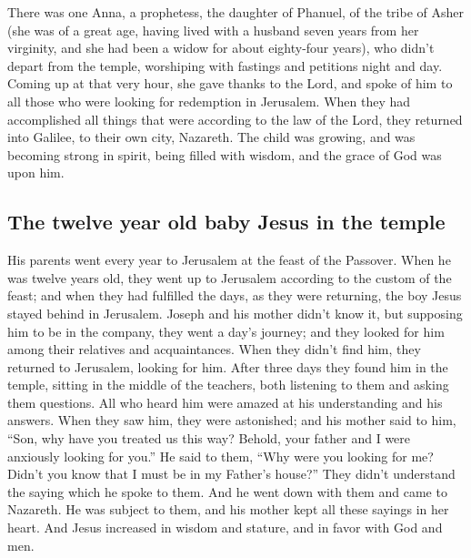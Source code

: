  There was one Anna, a prophetess, the daughter of
Phanuel, of the tribe of Asher (she was of a great age, having lived
with a husband seven years from her virginity,  and she
had been a widow for about eighty-four years), who didn't depart from
the temple, worshiping with fastings and petitions night and day.
 Coming up at that very hour, she gave thanks to the
Lord, and spoke of him to all those who were looking for redemption in
Jerusalem.  When they had accomplished all things that
were according to the law of the Lord, they returned into Galilee, to
their own city, Nazareth.  The child was growing, and was
becoming strong in spirit, being filled with wisdom, and the grace of
God was upon him.

\hypertarget{the-twelve-year-old-baby-jesus-in-the-temple}{%
\subsection{The twelve year old baby Jesus in the
temple}\label{the-twelve-year-old-baby-jesus-in-the-temple}}

 His parents went every year to Jerusalem at the feast of
the Passover.  When he was twelve years old, they went up
to Jerusalem according to the custom of the feast;  and
when they had fulfilled the days, as they were returning, the boy Jesus
stayed behind in Jerusalem. Joseph and his mother didn't know it,
 but supposing him to be in the company, they went a
day's journey; and they looked for him among their relatives and
acquaintances.  When they didn't find him, they returned
to Jerusalem, looking for him.  After three days they
found him in the temple, sitting in the middle of the teachers, both
listening to them and asking them questions.  All who
heard him were amazed at his understanding and his answers.
 When they saw him, they were astonished; and his mother
said to him, ``Son, why have you treated us this way? Behold, your
father and I were anxiously looking for you.''  He said
to them, ``Why were you looking for me? Didn't you know that I must be
in my Father's house?''  They didn't understand the
saying which he spoke to them.  And he went down with
them and came to Nazareth. He was subject to them, and his mother kept
all these sayings in her heart.  And Jesus increased in
wisdom and stature, and in favor with God and men.

